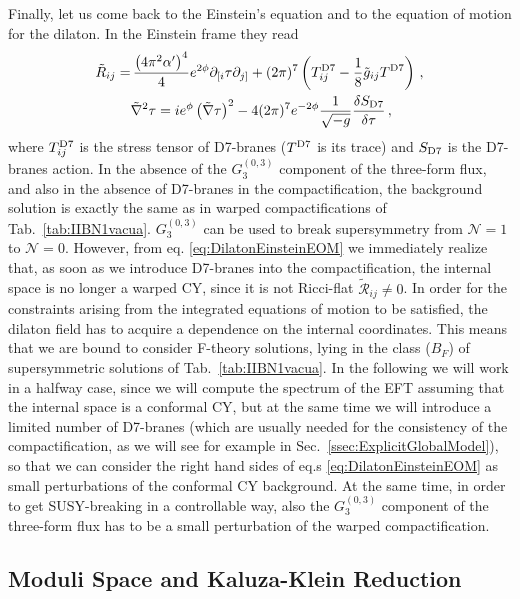 \documentclass[12pt,a4paper]{book}
\begin{document}
Finally, let us come back to the Einstein's equation and to the equation of motion for the dilaton. In the Einstein frame they read
\begin{align}
\label{eq:DilatonEinsteinEOM}
\tilde{R}_{ij} =&\, \frac{\left(4 \pi^2 \alpha'\right)^4}{4} e^{2 \phi} \partial_{[i} \tau \partial_{j]} + (2 \pi)^7 \left(T_{ij}^{\rm D7} - \frac{1}{8} \tilde{g}_{ij} T^{\rm D7}\right) \,, \nonumber \\
&\tilde{\nabla}^2 \tau = i e^\phi \left(\tilde{\nabla} \tau\right)^2 - 4 (2 \pi)^7 e^{-2 \phi} \frac{1}{\sqrt{-g}} \frac{\delta S_{\rm D7}}{\delta \tau} \,,
\end{align}
where $T^{\rm D7}_{ij}$ is the stress tensor of D7-branes ($T^{\rm D7}$ is its trace) and $S_{\rm D7}$ is the D7-branes action. In the absence of the $G^{(0,3)}_3$ component of the three-form flux, and also in the absence of D7-branes in the compactification, the background solution is exactly the same as in warped compactifications of Tab.~\ref{tab:IIBN1vacua}. $G^{(0,3)}_3$ can be used to break supersymmetry from $\mathcal{N} = 1$ to $\mathcal{N} = 0$. However, from eq. \eqref{eq:DilatonEinsteinEOM} we immediately realize that, as soon as we introduce D7-branes into the compactification, the internal space is no longer a warped CY, since it is not Ricci-flat $\tilde{\mathcal{R}}_{ij} \neq 0$. In order for the constraints arising from the integrated equations of motion to be satisfied, the dilaton field has to acquire a dependence on the internal coordinates. This means that we are bound to consider F-theory solutions, lying in the class ($B_F$) of supersymmetric solutions of Tab.~\ref{tab:IIBN1vacua}. In the following we will work in a halfway case, since we will compute the spectrum of the EFT assuming that the internal space is a conformal CY, but at the same time we will introduce a limited number of D7-branes (which are usually needed for the consistency of the compactification, as we will see for example in Sec.~\ref{ssec:ExplicitGlobalModel}), so that we can consider the right hand sides of eq.s \eqref{eq:DilatonEinsteinEOM} as small perturbations of the conformal CY background. At the same time, in order to get SUSY-breaking in a controllable way, also the $G^{(0,3)}_3$ component of the three-form flux has to be a small perturbation of the warped compactification.


\subsection{Moduli Space and Kaluza-Klein Reduction}
\label{ssec:ModuliSpace}
\end{document}
